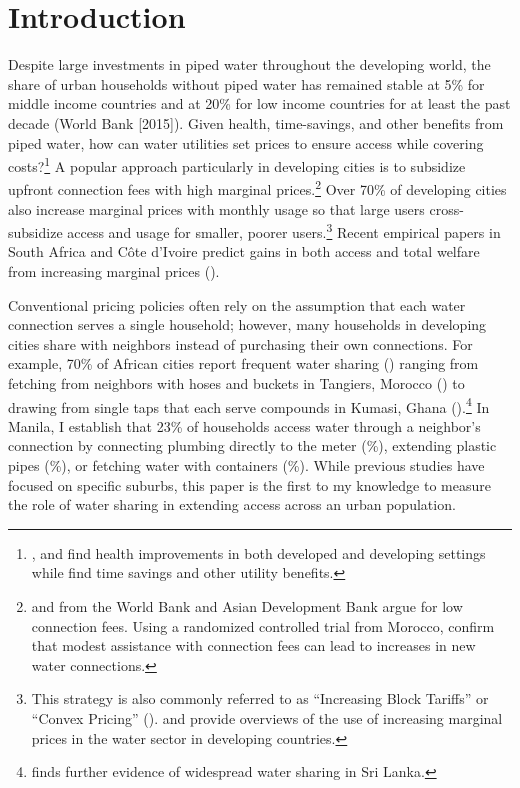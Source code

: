 \documentclass[12pt]{article}
\begin{document}
\section{Introduction}
 
Despite large investments in piped water throughout the developing world, the share of urban households without piped water has remained stable at 5\% for middle income countries and at 20\% for low income countries for at least the past decade (World Bank [2015]).  Given health, time-savings, and other benefits from piped water, how can water utilities set prices to ensure access while covering costs?\footnote{\cite{gamper2010impact,cutler2005role}, and \cite{galiani2005water} find health improvements in both developed and developing settings while \cite{devoto2012happiness} find time savings and other utility benefits.}  A popular approach particularly in developing cities is to subsidize upfront connection fees with high marginal prices.\footnote{\cite{mcintosh2003asian} and \cite{komives2006distributional} from the World Bank and Asian Development Bank argue for low connection fees.  Using a randomized controlled trial from Morocco, \cite{devoto2012happiness} confirm that modest assistance with connection fees can lead to increases in new water connections.}  Over 70\% of developing cities also increase marginal prices with monthly usage so that large users cross-subsidize access and usage for smaller, poorer users.\footnote{This strategy is also commonly referred to as ``Increasing Block Tariffs'' or  ``Convex Pricing'' (\cite{borenstein2012redistributional}). \cite{hoque2013state} and \cite{boland2000political} provide overviews of the use of increasing marginal prices in the water sector in developing countries.}  Recent empirical papers in South Africa and C{\^o}te d'Ivoire predict gains in both access and total welfare from increasing marginal prices (\cite{szabo2015value,diakite2009proposal}). 



Conventional pricing policies often rely on the assumption that each water connection serves a single household; however, many households in developing cities share with neighbors instead of purchasing their own connections.  For example, 70\% of African cities report frequent water sharing (\cite{keener2010provision}) ranging from fetching from neighbors with hoses and buckets in Tangiers, Morocco (\cite{devoto2012happiness}) to drawing from single taps that each serve compounds in Kumasi, Ghana (\cite{whittington1992possible}).\footnote{\cite{nauges2006water} finds further evidence of widespread water sharing in Sri Lanka.}  In Manila, I establish that 23\% of households access water through a neighbor's connection by connecting plumbing directly to the meter (\unskip\%), extending plastic pipes (\unskip\%), or fetching water with containers (\unskip\%).  While previous studies have focused on specific suburbs, this paper is the first to my knowledge to measure the role of water sharing in extending access across an urban population.
\end{document}
